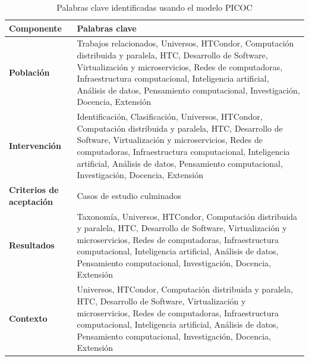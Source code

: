 \begin{table}[htbp]
	\centering
	\caption{Palabras clave identificadas usando el modelo PICOC}
	\label{table:picoc_keywords}
	\renewcommand{\arraystretch}{1.5}  %
	\begin{tabular}{p{1.8cm}p{5.7cm}}
		\toprule
		\textbf{Componente}               & \textbf{Palabras clave}                                                                                                                                                                                                                                                                                               \\
		\midrule
		\textbf{Población}                & Trabajos relacionados, Universos, HTCondor, Computación distribuida y paralela, HTC, Desarrollo de Software, Virtualización y microservicios, Redes de computadoras, Infraestructura computacional, Inteligencia artificial, Análisis de datos, Pensamiento computacional, Investigación, Docencia, Extensión         \\
		\addlinespace[0.8em]
		\textbf{Intervención}             & Identificación, Clasificación, Universos, HTCondor, Computación distribuida y paralela, HTC, Desarrollo de Software, Virtualización y microservicios, Redes de computadoras, Infraestructura computacional, Inteligencia artificial, Análisis de datos, Pensamiento computacional, Investigación, Docencia, Extensión \\
		\addlinespace[0.8em]
		\textbf{Criterios de aceptación}  & Casos de estudio culminados                                                                                                                                                                                                                                                                                           \\
		\addlinespace[0.8em]
		\textbf{Resultados              } & Taxonomía, Universos, HTCondor, Computación distribuida y paralela, HTC, Desarrollo de Software, Virtualización y microservicios, Redes de computadoras, Infraestructura computacional, Inteligencia artificial, Análisis de datos, Pensamiento computacional, Investigación, Docencia, Extensión                     \\
		\addlinespace[0.8em]
		\textbf{Contexto}                 & Universos, HTCondor, Computación distribuida y paralela, HTC, Desarrollo de Software, Virtualización y microservicios, Redes de computadoras, Infraestructura computacional, Inteligencia artificial, Análisis de datos, Pensamiento computacional, Investigación, Docencia, Extensión                                \\
		\bottomrule
	\end{tabular}
\end{table}



